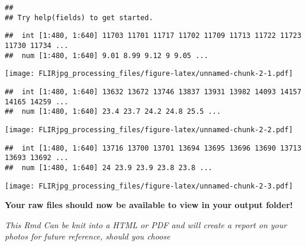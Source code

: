 \documentclass[
]{article}
\begin{document}
\begin{verbatim}
## 
## Try help(fields) to get started.
\end{verbatim}

\begin{verbatim}
##  int [1:480, 1:640] 11703 11701 11717 11702 11709 11713 11722 11723 11730 11734 ...
##  num [1:480, 1:640] 9.01 8.99 9.12 9 9.05 ...
\end{verbatim}

\texttt{[image: FLIRjpg\_processing\_files/figure-latex/unnamed-chunk-2-1.pdf]}

\begin{verbatim}
##  int [1:480, 1:640] 13632 13672 13746 13837 13931 13982 14093 14157 14165 14259 ...
##  num [1:480, 1:640] 23.4 23.7 24.2 24.8 25.5 ...
\end{verbatim}

\texttt{[image: FLIRjpg\_processing\_files/figure-latex/unnamed-chunk-2-2.pdf]}

\begin{verbatim}
##  int [1:480, 1:640] 13716 13700 13701 13694 13695 13696 13690 13713 13693 13692 ...
##  num [1:480, 1:640] 24 23.9 23.9 23.8 23.8 ...
\end{verbatim}

\texttt{[image: FLIRjpg\_processing\_files/figure-latex/unnamed-chunk-2-3.pdf]}

\textbf{Your raw files should now be available to view in your output
folder!}

\emph{This Rmd Can be knit into a HTML or PDF and will create a report
on your photos for future reference, should you choose}
\end{document}

